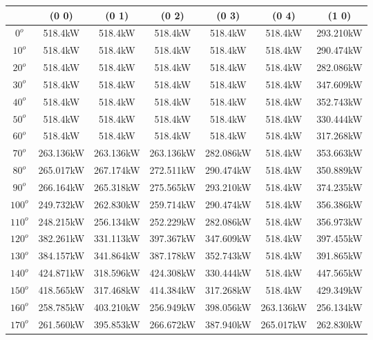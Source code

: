         \singlespacing
        \begin{table}[H]
        	\centering
        	\begin{tabular}{|c|c|c|c|c|c|c|} \hline
        			& (0 0)		& (0 1)		& (0 2)		& (0 3)		& (0 4)		& (1 0)		\\ \hline
		$0^o$	& 518.4kW	& 518.4kW	& 518.4kW	& 518.4kW	& 518.4kW	& 293.210kW	\\ \hline
		$10^o$	& 518.4kW	& 518.4kW	& 518.4kW	& 518.4kW	& 518.4kW	& 290.474kW	\\ \hline
		$20^o$	& 518.4kW	& 518.4kW	& 518.4kW	& 518.4kW	& 518.4kW	& 282.086kW	\\ \hline
		$30^o$	& 518.4kW	& 518.4kW	& 518.4kW	& 518.4kW	& 518.4kW	& 347.609kW	\\ \hline
		$40^o$	& 518.4kW	& 518.4kW	& 518.4kW	& 518.4kW	& 518.4kW	& 352.743kW	\\ \hline
		$50^o$	& 518.4kW	& 518.4kW	& 518.4kW	& 518.4kW	& 518.4kW	& 330.444kW	\\ \hline
		$60^o$	& 518.4kW	& 518.4kW	& 518.4kW	& 518.4kW	& 518.4kW	& 317.268kW	\\ \hline
		$70^o$	& 263.136kW	& 263.136kW	& 263.136kW	& 282.086kW	& 518.4kW	& 353.663kW	\\ \hline
		$80^o$	& 265.017kW	& 267.174kW	& 272.511kW	& 290.474kW	& 518.4kW	& 350.889kW	\\ \hline
		$90^o$	& 266.164kW	& 265.318kW	& 275.565kW	& 293.210kW	& 518.4kW	& 374.235kW	\\ \hline
		$100^o$	& 249.732kW	& 262.830kW	& 259.714kW	& 290.474kW	& 518.4kW	& 356.386kW	\\ \hline
		$110^o$	& 248.215kW	& 256.134kW	& 252.229kW	& 282.086kW	& 518.4kW	& 356.973kW	\\ \hline
		$120^o$	& 382.261kW	& 331.113kW	& 397.367kW	& 347.609kW	& 518.4kW	& 397.455kW	\\ \hline
		$130^o$	& 384.157kW	& 341.864kW	& 387.178kW	& 352.743kW	& 518.4kW	& 391.865kW	\\ \hline
		$140^o$	& 424.871kW	& 318.596kW	& 424.308kW	& 330.444kW	& 518.4kW	& 447.565kW	\\ \hline
		$150^o$	& 418.565kW	& 317.468kW	& 414.384kW	& 317.268kW	& 518.4kW	& 429.349kW	\\ \hline
		$160^o$	& 258.785kW	& 403.210kW	& 256.949kW	& 398.056kW	& 263.136kW	& 256.134kW	\\ \hline
		$170^o$	& 261.560kW	& 395.853kW	& 266.672kW	& 387.940kW	& 265.017kW	& 262.830kW	\\ \hline

\end{tabular}
\end{table}
